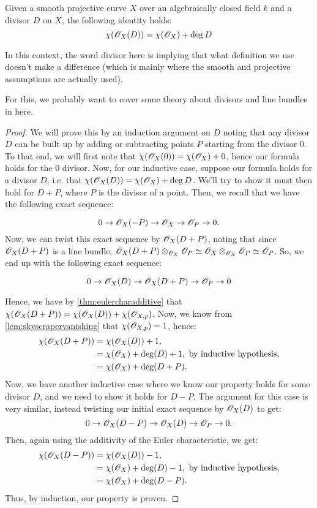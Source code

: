 \begin{theorem}\label{thm:riemannroch}
  Given a smooth projective curve $X$ over an algebraically closed field $k$ and a divisor $D$ on $X$, the following identity holds:
  \[
  \chi(\mathscr{O}_X(D)) = \chi(\mathscr{O}_X) + \deg D
  \]

  In this context, the word divisor here is implying that what definition we use
  doesn't make a difference (which is mainly where the smooth and projective
  assumptions are actually used).

  For this, we probably want to cover some theory about divisors and line bundles
  in here.
  \end{theorem}
  \begin{proof}
  We will prove this by an induction argument on $D$ noting that any divisor $D$ can be built up by adding or subtracting points $P$ starting from the divisor $0$. To that end, we will first note that $\chi(\mathscr{O}_X(0)) = \chi(\mathscr{O}_X) + 0$, hence our formula holds for the $0$ divisor. Now, for our inductive case, suppose our formula holds for a divisor $D$, i.e. that $\chi(\mathscr{O}_X(D)) = \chi(\mathscr{O}_X) + \deg D$. We'll try to show it must then hold for $D + P$, where $P$ is the divisor of a point. Then, we recall that we have the following exact sequence:

  \[
  0 \rightarrow \mathscr{O}_X(-P) \rightarrow \mathscr{O}_X \rightarrow \mathscr{O}_P \rightarrow 0.
  \]
  Now, we can twist this exact sequence by $\mathscr{O}_X(D+P)$, noting that since $\mathscr{O}_X(D+P)$ is a line bundle, $\mathscr{O}_X(D+P) \otimes_{\mathscr{O}_X} \mathscr{O}_P \simeq \mathscr{O}_X \otimes_{\mathscr{O}_X} \mathscr{O}_P \simeq \mathscr{O}_P$. So, we end up with the following exact sequence:

  \[
  0 \rightarrow \mathscr{O}_X(D) \rightarrow \mathscr{O}_X(D + P) \rightarrow \mathscr{O}_P \rightarrow 0
  \]

  Hence, we have by \autoref{thm:eulercharadditive} that $\chi(\mathscr{O}_X(D+P)) = \chi(\mathscr{O}_X(D)) + \chi(\mathscr{O}_{X, p})$. Now, we know from \autoref{lem:skyscrapervanishing} that $\chi(\mathscr{O}_{X, p}) = 1$, hence:
  \[
  \begin{split}
  \chi(\mathscr{O}_X(D+P)) &= \chi(\mathscr{O}_X(D)) + 1,\\
  &= \chi(\mathscr{O}_X) + \deg(D) + 1, \text{ by inductive hypothesis,}\\
  &= \chi(\mathscr{O}_X) + \deg(D + P).\\
  \end{split}
  \]
  Now, we have another inductive case where we know our property holds for some divisor $D$, and we need to show it holds for $D - P$. The argument for this case is very similar, instead twisting our initial exact sequence by $\mathscr{O}_X(D)$ to get:
  \[
  0 \rightarrow \mathscr{O}_X(D-P) \rightarrow \mathscr{O}_X(D) \rightarrow \mathscr{O}_P \rightarrow 0.
  \]
  Then, again using the additivity of the Euler characteristic, we get:
  \[
  \begin{split}
  \chi(\mathscr{O}_X(D-P)) &= \chi(\mathscr{O}_X(D)) -1,\\
  &= \chi(\mathscr{O}_X) + \deg(D) - 1, \text{ by inductive hypothesis,}\\
  &= \chi(\mathscr{O}_X) + \deg(D - P).\\
  \end{split}
  \]
  Thus, by induction, our property is proven.
  \end{proof}
